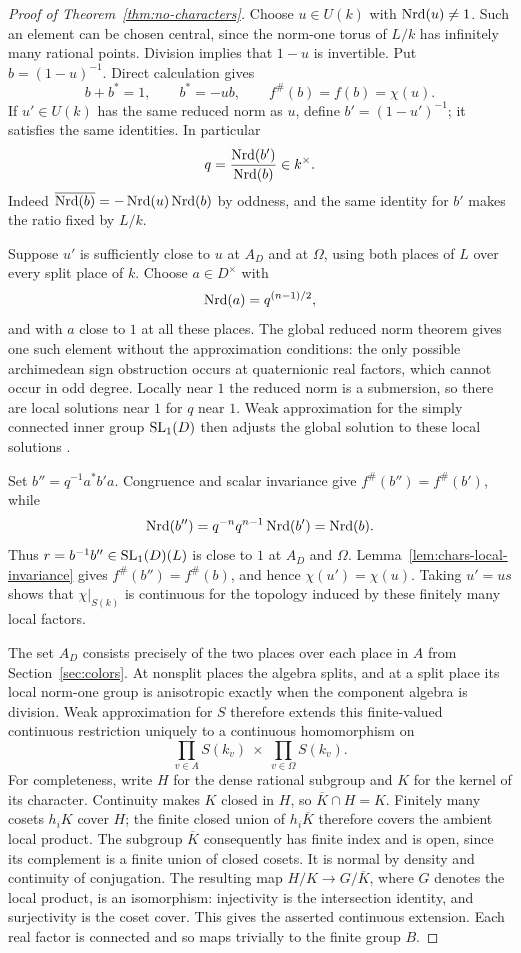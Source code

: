 \begin{proof}[Proof of Theorem~\ref{thm:no-characters}]
Choose $u\in U(k)$ with $\operatorname{Nrd}(u)\ne1$. Such an element can be chosen
central, since the norm-one torus of $L/k$ has infinitely many rational
points. Division implies that $1-u$ is invertible. Put
$b=(1-u)^{-1}$. Direct calculation gives
\begin{equation}\label{eq:chars-final-b}
 b+b^*=1,\qquad b^*=-ub,\qquad f^\#(b)=f(b)=\chi(u).
\end{equation}
If $u'\in U(k)$ has the same reduced norm as $u$, define
$b'=(1-u')^{-1}$; it satisfies the same identities. In particular
\[
 q=\frac{\operatorname{Nrd}(b')}{\operatorname{Nrd}(b)}\in k^\times.
\]
Indeed $\overline{\operatorname{Nrd}(b)}=-\operatorname{Nrd}(u)\operatorname{Nrd}(b)$ by oddness, and the same
identity for $b'$ makes the ratio fixed by $L/k$.

Suppose $u'$ is sufficiently close to $u$ at $A_D$ and at $\Omega$,
using both places of $L$ over every split place of $k$. Choose
$a\in D^\times$ with
\[
 \operatorname{Nrd}(a)=q^{(n-1)/2},
\]
and with $a$ close to $1$ at all these places. The global reduced norm
theorem gives one such element without the approximation conditions:
the only possible archimedean sign obstruction occurs at quaternionic
real factors, which cannot occur in odd degree. Locally near $1$ the
reduced norm is a submersion, so there are local solutions near $1$ for
$q$ near $1$. Weak approximation for the simply connected inner group
$\operatorname{SL}_1(D)$ then adjusts the global solution to these local solutions
\cite{PRbook,Reiner}.

Set $b''=q^{-1}a^*b'a$. Congruence and scalar invariance give
$f^\#(b'')=f^\#(b')$, while
\[
 \operatorname{Nrd}(b'')=q^{-n}q^{n-1}\operatorname{Nrd}(b')=\operatorname{Nrd}(b).
\]
Thus $r=b^{-1}b''\in\operatorname{SL}_1(D)(L)$ is close to $1$ at $A_D$ and
$\Omega$. Lemma~\ref{lem:chars-local-invariance} gives
$f^\#(b'')=f^\#(b)$, and hence $\chi(u')=\chi(u)$.
Taking $u'=us$ shows that $\chi|_{S(k)}$ is continuous for the topology
induced by these finitely many local factors.

The set $A_D$ consists precisely of the two places over each place in
$A$ from Section~\ref{sec:colors}. At nonsplit places the algebra
splits, and at a split place its local norm-one group is anisotropic
exactly when the component algebra is division. Weak approximation for
$S$ therefore extends this finite-valued continuous restriction uniquely
to a continuous homomorphism on
\[
 \prod_{v\in A}S(k_v)\ \times\ \prod_{v\in\Omega}S(k_v).
\]
For completeness, write $H$ for the dense rational subgroup and $K$ for
the kernel of its character. Continuity makes $K$ closed in $H$, so
$\overline K\cap H=K$. Finitely many cosets $h_iK$ cover $H$; the
finite closed union of $h_i\overline K$ therefore covers the ambient
local product. The subgroup $\overline K$ consequently has finite index
and is open, since its complement is a finite union of closed cosets.
It is normal by density and continuity of conjugation. The resulting
map $H/K\to G/\overline K$, where $G$ denotes the local product, is an
isomorphism: injectivity is the intersection identity, and surjectivity
is the coset cover. This gives the asserted continuous extension. Each real
factor is connected and so maps trivially to the finite group $B$.


\end{proof}
